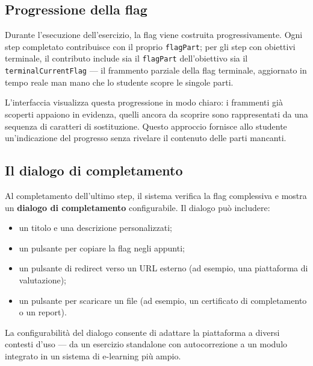 \subsection{Progressione della flag}

Durante l'esecuzione dell'esercizio, la flag viene costruita progressivamente. Ogni step completato contribuisce con il proprio \texttt{flagPart}; per gli step con obiettivi terminale, il contributo include sia il \texttt{flagPart} dell'obiettivo sia il \texttt{terminalCurrentFlag} --- il frammento parziale della flag terminale, aggiornato in tempo reale man mano che lo studente scopre le singole parti.

L'interfaccia visualizza questa progressione in modo chiaro: i frammenti già scoperti appaiono in evidenza, quelli ancora da scoprire sono rappresentati da una sequenza di caratteri di sostituzione. Questo approccio fornisce allo studente un'indicazione del progresso senza rivelare il contenuto delle parti mancanti.

\subsection{Il dialogo di completamento}

Al completamento dell'ultimo step, il sistema verifica la flag complessiva e mostra un \textbf{dialogo di completamento} configurabile. Il dialogo può includere:

\begin{itemize}
    \item un titolo e una descrizione personalizzati;
    \item un pulsante per copiare la flag negli appunti;
    \item un pulsante di redirect verso un URL esterno (ad esempio, una piattaforma di valutazione);
    \item un pulsante per scaricare un file (ad esempio, un certificato di completamento o un report).
\end{itemize}

La configurabilità del dialogo consente di adattare la piattaforma a diversi contesti d'uso --- da un esercizio standalone con autocorrezione a un modulo integrato in un sistema di e-learning più ampio.
